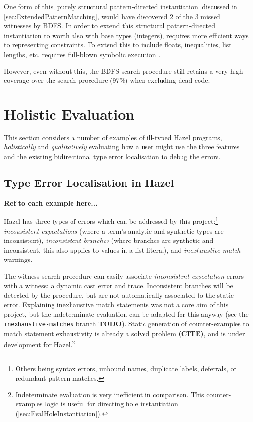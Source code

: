 One form of this, purely structural pattern-directed instantiation, discussed in \cref{sec:ExtendedPatternMatching}, would have discovered 2 of the 3 missed witnesses by BDFS. In order to extend this structural pattern-directed instantiation to worth also with base types (integers), requires more efficient ways to representing constraints. To extend this to include floats, inequalities, list lengths, etc. requires full-blown symbolic execution \cite{SymbolicExecutionSurvey}. 

However, even without this, the BDFS search procedure still retains a very high coverage over the search procedure (97\%) when excluding dead code.

\section{Holistic Evaluation}
\label{sec:HolisticEvaluation}

This section considers a number of examples of ill-typed Hazel programs, \textit{holistically} and \textit{qualitatively} evaluating how a user might use the three features and the existing bidirectional type error localisation \cite{MarkedLocalisation} to debug the errors. 


\subsection{Type Error Localisation in Hazel}
\textbf{Ref to each example here...}

Hazel has three types of errors which can be addressed by this project:\footnote{Others being syntax errors, unbound names, duplicate labels, deferrals, or redundant pattern matches.} \textit{inconsistent expectations} (where a term's analytic and synthetic types are inconsistent), \textit{inconsistent branches }(where branches are synthetic and inconsistent, this also applies to values in a list literal), and \textit{inexhaustive match} warnings. 

The witness search procedure can easily associate \textit{inconsistent expectation} errors with a witness: a dynamic cast error and trace. Inconsistent branches will be detected by the procedure, but are not automatically associated to the static error. Explaining inexhaustive match statements was not a core aim of this project, but the indeterminate evaluation can be adapted for this anyway (see the \texttt{inexhaustive-matches} branch \textbf{TODO}). Static generation of counter-examples to match statement exhaustivity is already a solved problem \textbf{(CITE)}, and is under development for Hazel.\footnote{Indeterminate evaluation is very inefficient in comparison. This counter-examples logic is useful for directing hole instantiation (\cref{sec:EvalHoleInstantiation}).}

